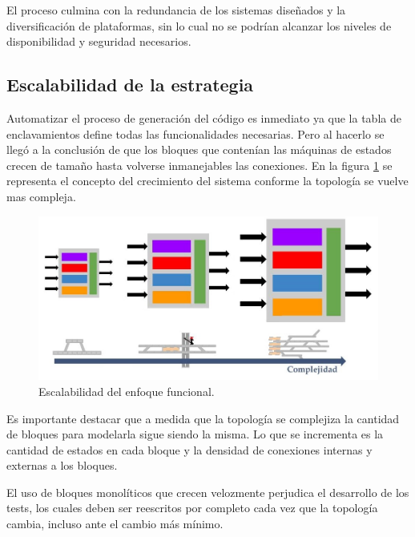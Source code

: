 		El proceso culmina con la redundancia de los sistemas diseñados y la diversificación de plataformas, sin lo cual no se podrían alcanzar los niveles de disponibilidad y seguridad necesarios.
			
				
	\subsection{Escalabilidad de la estrategia}	
		
		Automatizar el proceso de generación del código es inmediato ya que la tabla de enclavamientos define todas las funcionalidades necesarias. Pero al hacerlo se llegó a la conclusión de que los bloques que contenían las máquinas de estados crecen de tamaño hasta volverse inmanejables las conexiones. En la figura \ref{fig:Escala_Funcional} se representa el concepto del crecimiento del sistema conforme la topología se vuelve mas compleja.		
					
		\begin{figure}[h]
		\centering
			\includegraphics[scale=.5]{./Figures/Funcional_complejidad}
			\caption{Escalabilidad del enfoque funcional.}
			\label{fig:Escala_Funcional}
		\end{figure}
		
	Es importante destacar que a medida que la topología se complejiza la cantidad de bloques para modelarla sigue siendo la misma. Lo que se incrementa es la cantidad de estados en cada bloque y la densidad de conexiones internas y externas a los bloques.
			
	El uso de bloques monolíticos que crecen velozmente perjudica el desarrollo de los tests, los cuales deben ser reescritos por completo cada vez que la topología cambia, incluso ante el cambio más mínimo. 
	
